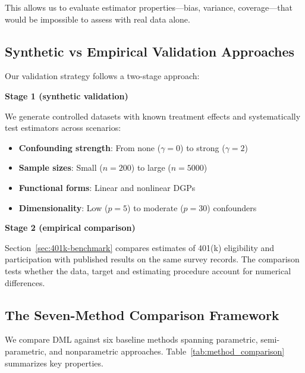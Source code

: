 This allows us to evaluate estimator properties---bias, variance, coverage---that would be impossible to assess with real data alone.

\subsection{Synthetic vs Empirical Validation Approaches}

Our validation strategy follows a two-stage approach:

\textbf{Stage 1 (synthetic validation)}

We generate controlled datasets with known treatment effects and systematically test estimators across scenarios:
\begin{itemize}
    \item \textbf{Confounding strength}: From none ($\gamma = 0$) to strong ($\gamma = 2$)
    \item \textbf{Sample sizes}: Small ($n=200$) to large ($n=5000$)
    \item \textbf{Functional forms}: Linear and nonlinear DGPs
    \item \textbf{Dimensionality}: Low ($p=5$) to moderate ($p=30$) confounders
\end{itemize}

\textbf{Stage 2 (empirical comparison)}

Section~\ref{sec:401k-benchmark} compares estimates of 401(k) eligibility and participation with published results on the same survey records. The comparison tests whether the data, target and estimating procedure account for numerical differences.

\subsection{The Seven-Method Comparison Framework}

We compare DML against six baseline methods spanning parametric, semi-parametric, and nonparametric approaches. Table~\ref{tab:method_comparison} summarizes key properties.

